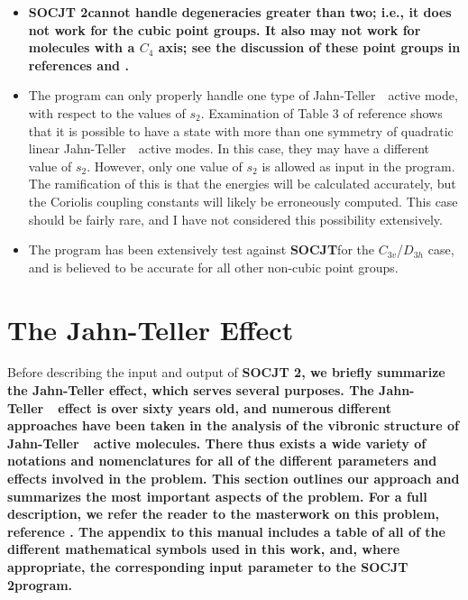 \documentclass{article}
\newcommand{\JT}{Jahn-Teller\ }
\newcommand{\socjttwo}{\bf{SOCJT 2}}
\newcommand{\socjt}{{\bf SOCJT}}
\newenvironment{bulletlist}{%
  \renewcommand{\labelitemi}{$\bullet $}%
     \begin{itemize}}{\end{itemize}}
\begin{document}
\begin{bulletlist}
\item \socjttwo cannot handle degeneracies greater than two; i.e., it
  does not work for the cubic point groups. It also may not
  work for molecules with a $C_4$ axis; see the discussion of these
  point groups in references  and .
\item The program can only properly handle one type of \JT\ active
  mode, with respect to the values of $s_2$. Examination of
  Table 3 of reference  shows that it is possible to have
  a state with more than one symmetry of quadratic linear \JT\ active
  modes. In this case, they may have a different value of
  $s_2$. However, only one value of $s_2$ is allowed as input in the
  program. The ramification of this is that the energies will be
  calculated accurately, but the Coriolis coupling constants will
  likely be erroneously computed. This case should be fairly rare, and
  I have not considered this possibility extensively.
\item The program has been extensively test against \socjt for the $C_{3v}$/$D_{3h}$ case, and
  is believed to be accurate for all other non-cubic point groups.
\end{bulletlist}

\section{The Jahn-Teller Effect} \label{section:jt}

Before describing the input and output of \socjttwo, we briefly summarize
the Jahn-Teller effect, which serves several purposes. The \JT\ effect
is over sixty years old, and numerous different approaches have been
taken in the analysis of the vibronic structure of \JT\ active
molecules. There thus exists a wide variety of notations and
nomenclatures for all of the different parameters and effects involved
in the problem. This section outlines our approach and summarizes the
most important aspects of the problem. For a full description, we
refer the reader to the masterwork on this problem, reference
. The appendix to this manual includes a table of all of
the different mathematical symbols used in this work, and, where 
appropriate, the corresponding input parameter to the \socjttwo program.
\end{document}
